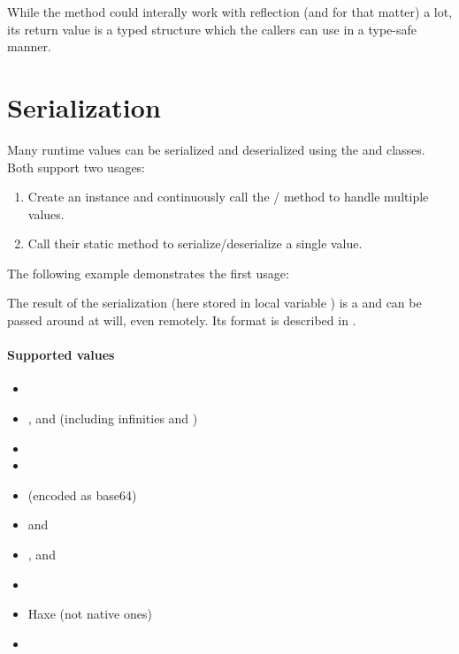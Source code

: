 While the method  could interally work with reflection (and  for that matter) a lot, its return value is a typed structure which the callers can use in a type-safe manner.


\section{Serialization}
\label{std-serialization}

Many runtime values can be serialized and deserialized using the  and  classes. Both support two usages:

\begin{enumerate}
	\item Create an instance and continuously call the / method to handle multiple values.
	\item Call their static  method to serialize/deserialize a single value.
\end{enumerate}

The following example demonstrates the first usage:


The result of the serialization (here stored in local variable ) is a  and can be passed around at will, even remotely. Its format is described in .

\paragraph{Supported values}

\begin{itemize}
	\item {}
	\item {},  and  (including infinities and )
	\item {}
	\item {}
	\item {} (encoded as base64)
	\item {} and 
	\item {},  and 
	\item {}
	\item Haxe  (not native ones)
	\item {}
\end{itemize}

